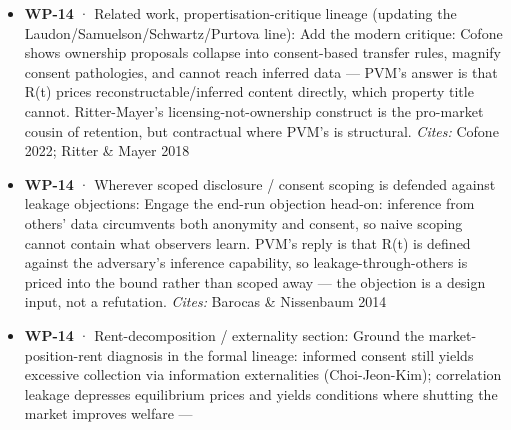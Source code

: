 \documentclass[
  11pt,
]{article}
\begin{document}
\begin{itemize}
  an established DP-markets design --- Li et al.~price DP-based privacy
  loss with arbitrage-freeness acting as a reconstruction bound on
  combined purchases; FL-Market adds subject-side structural retention
  with a priced LDP level; Liao et al.~show the design line is
  developed; Jones-Tonetti give the priced-use-of-retained-stock form in
  general equilibrium (retention assumed). Restate WP-14's novelty as:
  (a) the priced quantity is an adversary-relative, time-drifting
  reconstruction bound R(t), not a worst-case adversary-agnostic budget;
  (b) the stock is subject-held, not broker-held; (c)
  non-reconstructability is theorized as structural inalienability of a
  capital stock --- joining the Calabresi-Melamed/Radin inalienability
  category to a formal pricing metric, a cell neither the legal nor the
  DP-markets literature occupies. \emph{Cites:} Li, Li, Miklau \& Suciu
  2013/2014; Zheng et al.~(FL-Market) 2021; Liao et al.~2021; Jones \&
  Tonetti 2020; Calabresi \& Melamed 1972; Radin 1987
\item
  \textbf{WP-14} · Related work, propertisation-critique lineage
  (updating the Laudon/Samuelson/Schwartz/Purtova line): Add the modern
  critique: Cofone shows ownership proposals collapse into consent-based
  transfer rules, magnify consent pathologies, and cannot reach inferred
  data --- PVM's answer is that R(t) prices reconstructable/inferred
  content directly, which property title cannot. Ritter-Mayer's
  licensing-not-ownership construct is the pro-market cousin of
  retention, but contractual where PVM's is structural. \emph{Cites:}
  Cofone 2022; Ritter \& Mayer 2018
\item
  \textbf{WP-14} · Wherever scoped disclosure / consent scoping is
  defended against leakage objections: Engage the end-run objection
  head-on: inference from others' data circumvents both anonymity and
  consent, so naive scoping cannot contain what observers learn. PVM's
  reply is that R(t) is defined against the adversary's inference
  capability, so leakage-through-others is priced into the bound rather
  than scoped away --- the objection is a design input, not a
  refutation. \emph{Cites:} Barocas \& Nissenbaum 2014
\item
  \textbf{WP-14} · Rent-decomposition / externality section: Ground the
  market-position-rent diagnosis in the formal lineage: informed consent
  still yields excessive collection via information externalities
  (Choi-Jeon-Kim); correlation leakage depresses equilibrium prices and
  yields conditions where shutting the market improves welfare ---

\end{itemize}
\end{document}
